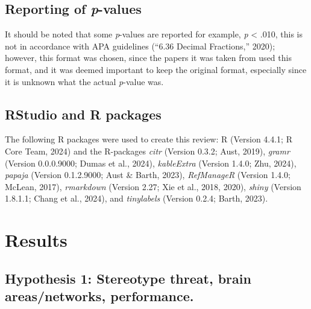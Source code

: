 \documentclass[
  stu, a4paper,floatsintext]{apa7}
\begin{document}
\subsection{\texorpdfstring{Reporting of \emph{p}-values}{Reporting of p-values}}\label{reporting-of-p-values}

It should be noted that some \emph{p}-values are reported for example, \emph{p} \textless{} .010, this is not in accordance with APA guidelines ({``6.36 {Decimal Fractions},''} 2020); however, this format was chosen, since the papers it was taken from used this format, and it was deemed important to keep the original format, especially since it is unknown what the actual \emph{p}-value was.

\subsection{RStudio and R packages}\label{rstudio-and-r-packages}

The following R packages were used to create this review: R (Version 4.4.1; R Core Team, 2024) and the R-packages \emph{citr} (Version 0.3.2; Aust, 2019), \emph{gramr} (Version 0.0.0.9000; Dumas et al., 2024), \emph{kableExtra} (Version 1.4.0; Zhu, 2024), \emph{papaja} (Version 0.1.2.9000; Aust \& Barth, 2023), \emph{RefManageR} (Version 1.4.0; McLean, 2017), \emph{rmarkdown} (Version 2.27; Xie et al., 2018, 2020), \emph{shiny} (Version 1.8.1.1; Chang et al., 2024), and \emph{tinylabels} (Version 0.2.4; Barth, 2023).

\section{Results}\label{results}

\subsection{Hypothesis 1: Stereotype threat, brain areas/networks, performance.}\label{hypothesis-1-stereotype-threat-brain-areasnetworks-performance.}
\end{document}
